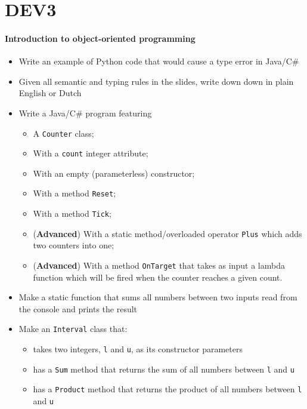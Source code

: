 \documentclass[12pt,a4paper,final]{article}
\begin{document}
		

	\section{DEV3}
		\paragraph{Introduction to object-oriented programming}
		\begin{itemize}
			\item Write an example of Python code that would cause a type error in Java/C\#
			\item Given all semantic and typing rules in the slides, write down down in plain English or Dutch
			\item Write a Java/C\# program featuring
			\begin{itemize}
				\item A \texttt{Counter} class;
				\item With a \texttt{count} integer attribute;
				\item With an empty (parameterless) constructor;
				\item With a method \texttt{Reset};
				\item With a method \texttt{Tick};
				\item (\textbf{Advanced}) With a static method/overloaded operator \texttt{Plus} which adds two counters into one;
				\item (\textbf{Advanced}) With a method \texttt{OnTarget} that takes as input a lambda function which will be fired when the counter reaches a given count.
			\end{itemize}
			\item Make a static function that sums all numbers between two inputs read from the console and prints the result
						
			\item Make an \texttt{Interval} class that:
			\begin{itemize}
				\item takes two integers, \texttt{l} and \texttt{u}, as its constructor parameters
				\item has a \texttt{Sum} method that returns the sum of all numbers between \texttt{l} and \texttt{u}
				\item has a \texttt{Product} method that returns the product of all numbers between \texttt{l} and \texttt{u}
			\end{itemize}
		
		\end{itemize}
\end{document}

